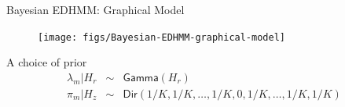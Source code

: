 \documentclass[xcolor=dvipsnames]{beamer}
\newcommand{\eqn}{\begin{equation}}
\newcommand{\enn}{\end{equation}}
\newcommand{\GP}{$\Gamma$P}
\begin{document}
\begin{frame}[t]{Bayesian EDHMM: Graphical Model}
	\begin{figure}[t]
		\begin{center}
			\texttt{[image: figs/Bayesian-EDHMM-graphical-model]}
		\end{center}
	\end{figure}
A choice of prior
\begin{eqnarray*}
\lambda_m | H_r &\sim&  \mathsf{Gamma}(H_r)\\
\pi_m | H_z &\sim& \mathsf{Dir}(1/K, 1/K, \ldots,  1/K, 0,1/K, \ldots,  1/K,  1/K) \\
\end{eqnarray*}


\end{frame}
%
%
%
%
%
\end{document}
